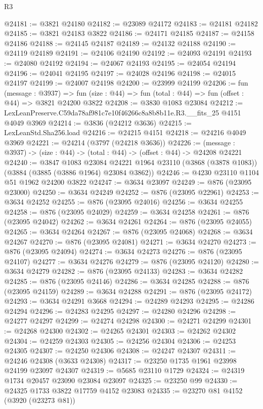 \begin{lexlean}{R3}
\begin{coremodule}
@24181 := @3821 @24180
@24182 := @23089 @24172
@24183 := @24181 @24182
@24185 := @3821 @24183 @3822
@24186 := @24171 @24185
@24187 := @24158 @24186
@24188 := @24145 @24187
@24189 := @24132 @24188
@24190 := @24119 @24189
@24191 := @24106 @24190
@24192 := @24093 @24191
@24193 := @24080 @24192
@24194 := @24067 @24193
@24195 := @24054 @24194
@24196 := @24041 @24195
@24197 := @24028 @24196
@24198 := @24015 @24197
@24199 := @24007 @24198
@24200 := @23999 @24199
@24206 := fun (message : @3937) =>
  fun (size : @44) => fun (total : @44) => fun (offset : @44) => @3821 @24200 @3822
@24208 := @3830 @1083 @23084
@24212 := LexLeanPreserve.C59da78af981c7e10f46266c8a8b8b11e.R3.__fits_25 @4151 @4049 @3969
@24214 := @3836 (@24212 @3636)
@24215 := LexLeanStd.Sha256.load
@24216 := @24215 @4151
@24218 := @24216 @4049 @3969
@24221 := @24214 (@3797 (@24218 @3636))
@24226 := (message : @3937) -> (size : @44) -> (total : @44) -> (offset : @44) -> @24208 @24221
@24240 := @3847
    @1083
    @23084
    @24221
    @1964
    @23110
    (@3868 (@3878 @1083))
    (@3884 (@3885 (@3886 @1964) @23084 @3862))
@24246 := @4230 @23110 @1104 @51 @1962 @24200 @3822
@24247 := @3634 @23097
@24249 := @876 (@23095 @23000)
@24250 := @3634 @24249
@24252 := @876 (@23095 @22961)
@24253 := @3634 @24252
@24255 := @876 (@23095 @24016)
@24256 := @3634 @24255
@24258 := @876 (@23095 @24029)
@24259 := @3634 @24258
@24261 := @876 (@23095 @24042)
@24262 := @3634 @24261
@24264 := @876 (@23095 @24055)
@24265 := @3634 @24264
@24267 := @876 (@23095 @24068)
@24268 := @3634 @24267
@24270 := @876 (@23095 @24081)
@24271 := @3634 @24270
@24273 := @876 (@23095 @24094)
@24274 := @3634 @24273
@24276 := @876 (@23095 @24107)
@24277 := @3634 @24276
@24279 := @876 (@23095 @24120)
@24280 := @3634 @24279
@24282 := @876 (@23095 @24133)
@24283 := @3634 @24282
@24285 := @876 (@23095 @24146)
@24286 := @3634 @24285
@24288 := @876 (@23095 @24159)
@24289 := @3634 @24288
@24291 := @876 (@23095 @24172)
@24293 := @3634 @24291 @3668
@24294 := @24289 @24293
@24295 := @24286 @24294
@24296 := @24283 @24295
@24297 := @24280 @24296
@24298 := @24277 @24297
@24299 := @24274 @24298
@24300 := @24271 @24299
@24301 := @24268 @24300
@24302 := @24265 @24301
@24303 := @24262 @24302
@24304 := @24259 @24303
@24305 := @24256 @24304
@24306 := @24253 @24305
@24307 := @24250 @24306
@24308 := @24247 @24307
@24311 := @24246 @24308 (@3633 @24308)
@24317 := @23250 @1735 @1961 @23998 @24199 @23097 @24307
@24319 := @5685 @23110 @1729
@24324 := @24319 @1734 @20457 @23090 @23084 @23097
@24325 := @23250 @99
@24330 := @24325 @1733 @3822 @17759 @4152 @23083
@24335 := @23270 @81 @4152 (@3920 (@23273 @81))

\end{coremodule}
\end{lexlean}
